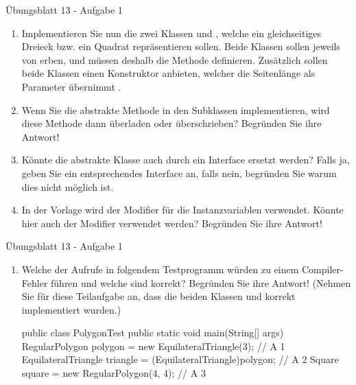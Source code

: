 \begin{frame}[c,fragile]{Übungsblatt 13 - Aufgabe 1}
\small\begin{enumerate}
    \item<2-> Implementieren Sie nun die zwei Klassen  und , welche ein gleichseitiges Dreieck bzw. ein Quadrat repräsentieren sollen. Beide Klassen sollen jeweils von  erben, und müssen deshalb die Methode  definieren. Zusätzlich sollen beide Klassen einen Konstruktor anbieten, welcher die Seitenlänge als Parameter übernimmt .
    \item<2-> Wenn Sie die abstrakte Methode  in den Subklassen implementieren, wird diese Methode dann überladen oder überschrieben? Begründen Sie ihre Antwort!
    \item<2-> Könnte die abstrakte Klasse auch durch ein Interface ersetzt werden? Falls ja, geben Sie ein entsprechendes Interface an, falls nein, begründen Sie warum dies nicht möglich ist.
    \item<2-> In der Vorlage wird der Modifier  für die Instanzvariablen verwendet. Könnte hier auch der Modifier  verwendet werden? Begründen Sie ihre Antwort!
    \end{enumerate}
\end{frame}

\begin{frame}[c,fragile]{Übungsblatt 13 - Aufgabe 1}
\small\begin{enumerate}
    \item<2->[5.] Welche der Aufrufe in folgendem Testprogramm würden zu einem Compiler-Fehler führen und welche sind korrekt? Begründen Sie ihre Antwort!
    (Nehmen Sie für diese Teilaufgabe an, dass die beiden Klassen  und  korrekt implementiert wurden.)
\begin{plainjava}[morekeywords={[3]{PolygonTest,RegularPolygon,EquilateralTriangle,Square}}]
public class PolygonTest {
   public static void main(String[] args) {
      RegularPolygon polygon = new EquilateralTriangle(3); // A 1
      EquilateralTriangle triangle = (EquilateralTriangle)polygon; // A 2
      Square square = new RegularPolygon(4, 4); // A 3
   }
}
\end{plainjava}
    \end{enumerate}
\end{frame}

